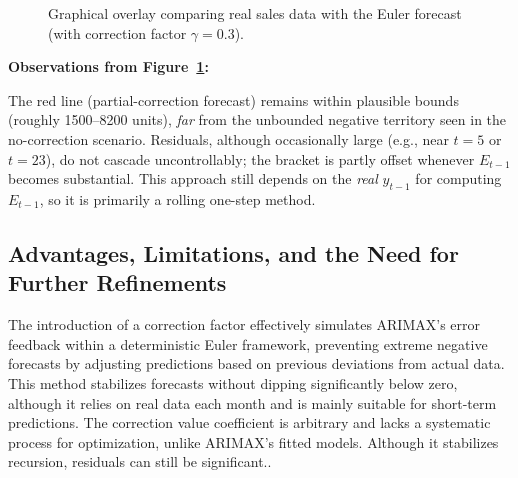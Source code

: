 \documentclass[10pt]{article}
\begin{document}
\begin{figure}[H]
\centering
{}
\caption{Graphical overlay comparing real sales data with the Euler forecast (with correction factor \(\gamma=0.3\)).}
\label{fig:euler_corr_graph}
\end{figure}

\textbf{Observations from Figure~\ref{fig:euler_corr_graph}:}

 The red line (partial-correction forecast) remains within plausible bounds (roughly 1500--8200 units), \emph{far} from the unbounded negative territory seen in the no-correction scenario.
 Residuals, although occasionally large (e.g., near $t=5$ or $t=23$), do not cascade uncontrollably; the bracket is partly offset whenever $E_{t-1}$ becomes substantial.
 This approach still depends on the \emph{real} $y_{t-1}$ for computing $E_{t-1}$, so it is primarily a rolling one-step method.

\subsection{Advantages, Limitations, and the Need for Further Refinements}
The introduction of a correction factor effectively simulates ARIMAX's error feedback within a deterministic Euler framework, preventing extreme negative forecasts by adjusting predictions based on previous deviations from actual data. This method stabilizes forecasts without dipping significantly below zero, although it relies on real data each month and is mainly suitable for short-term predictions. The correction value coefficient is arbitrary and lacks a systematic process for optimization, unlike ARIMAX's fitted models. Although it stabilizes recursion, residuals can still be significant..
\end{document}
